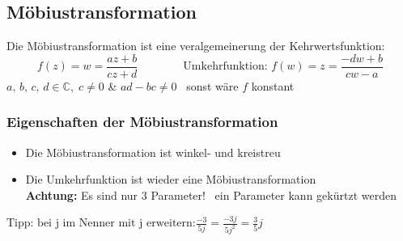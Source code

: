 \subsection{Möbiustransformation}

Die Möbiustransformation ist eine veralgemeinerung der Kehrwertsfunktion:
$$ f(z) = w = \frac{az + b}{cz + d} \qquad \qquad \text{Umkehrfunktion: } f(w) = z =\frac{-dw + b}{cw - a} $$
$a, \, b, \, c, \, d \in \mathbb{C}, \; c \neq0$ \& $ad - bc\neq 0$ \textrightarrow\ sonst wäre $f$ konstant


\smallskip

%


\subsubsection{Eigenschaften der Möbiustransformation}

\begin{itemize}
    \item Die Möbiustransformation ist winkel- und kreistreu
    \item Die Umkehrfunktion ist wieder eine Möbiustransformation \\
          \textbf{Achtung:} Es sind nur 3 Parameter! \textrightarrow\ ein Parameter kann gekürtzt werden
\end{itemize}

$\text{Tipp: bei j im Nenner mit j erweitern:} \frac{-3}{5j} = \frac{-3j}{5j^2} = \frac{3}{5}j$

